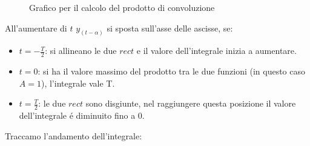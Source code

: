 \begin{figure}[H]
{
                \label{fig:PC rect in rect}
            }
            \caption{Grafico per il calcolo del prodotto di convoluzione}
        \end{figure}    
        All'aumentare di $t$ {\color{green}$y_{(t-\alpha)}$} si sposta sull'asse delle ascisse, se:
        \begin{itemize}
            \item {
                $t=-\frac{T}{2}$: si allineano le due $rect$ e il valore dell'integrale inizia a aumentare.
            }
            \item {
                $t=0$: si ha il valore massimo del prodotto tra le due funzioni (in questo caso $A=1$), l'integrale vale T.
            }
            \item {
                $t=\frac{T}{2}$: le due $rect$ sono disgiunte, nel raggiungere questa posizione il valore dell'integrale é diminuito fino a $0$.
            }
        \end{itemize}
        Traccamo l'andamento dell'integrale:
